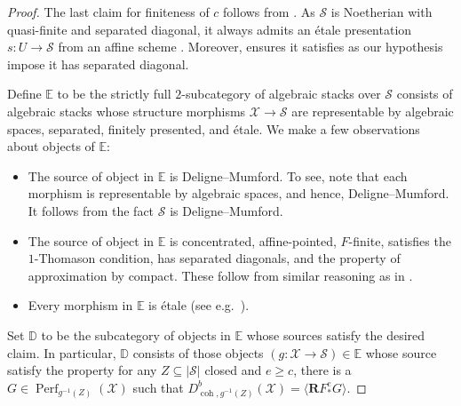 \documentclass[11pt]{amsart}
\theoremstyle{plain}
\theoremstyle{definition}
\numberwithin{equation}{section}
\numberwithin{theorem}{section}
\begin{document}
\begin{proof}
    The last claim for finiteness of $c$ follows from . 
    As $\mathcal{S}$ is Noetherian with quasi-finite and separated diagonal, it always admits an \'etale presentation $s\colon U\to \mathcal{S}$ from an affine scheme \cite[Theorem 7.2]{Rydh:2011}. 
    Moreover,  ensures it satisfies  as our hypothesis impose it has separated diagonal.

    Define $\mathbb{E}$ to be the strictly full $2$-subcategory of algebraic stacks over $\mathcal{S}$ consists of algebraic stacks whose structure morphisms $\mathcal{X}\to \mathcal{S}$ are representable by algebraic spaces, separated, finitely presented, and \'{e}tale. 
    We make a few observations about objects of $\mathbb{E}$:
    \begin{itemize}
        \item The source of object in $\mathbb{E}$ is Deligne--Mumford. 
        To see, note that each morphism is representable by algebraic spaces, and hence, Deligne--Mumford. 
        It follows from the fact $\mathcal{S}$ is Deligne--Mumford.
        \item The source of object in $\mathbb{E}$ is concentrated, affine-pointed, $F$-finite, satisfies the $1$-Thomason condition, has separated diagonals, and the property of approximation by compact. 
        These follow from similar reasoning as in .
        \item Every morphism in $\mathbb{E}$ is \'{e}tale (see e.g.\ \cite[\href{https://stacks.math.columbia.edu/tag/0CIR}{Tag 0CIR}]{stacks-project}).
    \end{itemize}
    Set $\mathbb{D}$ to be the subcategory of objects in $\mathbb{E}$ whose sources satisfy the desired claim. 
    In particular, $\mathbb{D}$ consists of those objects $(g\colon\mathcal{X}\to \mathcal{S})\in \mathbb{E}$ whose source satisfy the property for any $Z\subseteq |\mathcal{S}|$ closed and $e\geq c$, there is a $G\in \operatorname{Perf}_{g^{-1}(Z)} (\mathcal{X})$ such that $D^b_{\operatorname{coh},g^{-1}(Z)}(\mathcal{X})= \langle \mathbf{R} F_\ast^eG \rangle$.
    

\end{proof}
\end{document}
